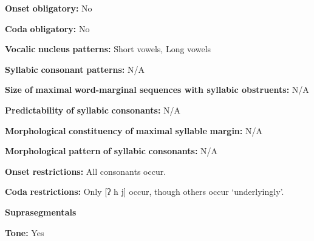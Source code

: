 \documentclass[output=paper]{langsci/langscibook}
\begin{document}
\begin{styleBody}
\textbf{Onset} \textbf{obligatory:} No
\end{styleBody}

\begin{styleBody}
\textbf{Coda} \textbf{obligatory:} No
\end{styleBody}

\begin{styleBody}
\textbf{Vocalic} \textbf{nucleus} \textbf{patterns:} Short vowels, Long vowels
\end{styleBody}

\begin{styleBody}
\textbf{Syllabic} \textbf{consonant} \textbf{patterns:} N/A
\end{styleBody}

\begin{styleBody}
\textbf{Size} \textbf{of} \textbf{maximal} \textbf{word{}-marginal sequences with syllabic obstruents:} N/A
\end{styleBody}

\begin{styleBody}
\textbf{Predictability} \textbf{of} \textbf{syllabic} \textbf{consonants:} N/A
\end{styleBody}

\begin{styleBody}
\textbf{Morphological} \textbf{constituency} \textbf{of} \textbf{maximal} \textbf{syllable} \textbf{margin:} N/A
\end{styleBody}

\begin{styleBody}
\textbf{Morphological} \textbf{pattern} \textbf{of} \textbf{syllabic} \textbf{consonants:} N/A
\end{styleBody}

\begin{styleBody}
\textbf{Onset} \textbf{restrictions:} All consonants occur.
\end{styleBody}

\begin{styleBody}
\textbf{Coda} \textbf{restrictions:} Only [ʔ h j] occur, though others occur ‘underlyingly’.
\end{styleBody}

\begin{styleBody}
\textbf{Suprasegmentals}
\end{styleBody}

\begin{styleBody}
\textbf{Tone:} Yes
\end{styleBody}
\end{document}
